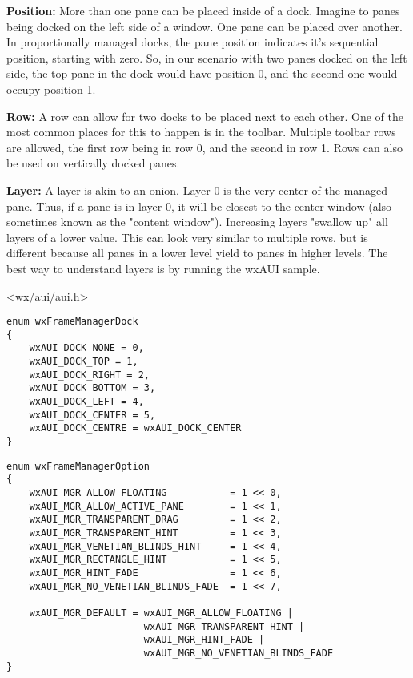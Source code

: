 {\bf Position:}
More than one pane can be placed inside of a dock. Imagine to panes
being docked on the left side of a window. One pane can be placed over
another. In proportionally managed docks, the pane position indicates
it's sequential position, starting with zero. So, in our scenario with
two panes docked on the left side, the top pane in the dock would have
position 0, and the second one would occupy position 1.

{\bf Row:}
A row can allow for two docks to be placed next to each other. One of
the most common places for this to happen is in the toolbar. Multiple
toolbar rows are allowed, the first row being in row 0, and the second
in row 1. Rows can also be used on vertically docked panes.


{\bf Layer:}
A layer is akin to an onion. Layer 0 is the very center of the
managed pane. Thus, if a pane is in layer 0, it will be closest to the
center window (also sometimes known as the "content window").
Increasing layers "swallow up" all layers of a lower value. This can
look very similar to multiple rows, but is different because all panes
in a lower level yield to panes in higher levels. The best way to
understand layers is by running the wxAUI sample.




<wx/aui/aui.h>




\begin{verbatim}
enum wxFrameManagerDock
{
    wxAUI_DOCK_NONE = 0,
    wxAUI_DOCK_TOP = 1,
    wxAUI_DOCK_RIGHT = 2,
    wxAUI_DOCK_BOTTOM = 3,
    wxAUI_DOCK_LEFT = 4,
    wxAUI_DOCK_CENTER = 5,
    wxAUI_DOCK_CENTRE = wxAUI_DOCK_CENTER
}
\end{verbatim}

\begin{verbatim}
enum wxFrameManagerOption
{
    wxAUI_MGR_ALLOW_FLOATING           = 1 << 0,
    wxAUI_MGR_ALLOW_ACTIVE_PANE        = 1 << 1,
    wxAUI_MGR_TRANSPARENT_DRAG         = 1 << 2,
    wxAUI_MGR_TRANSPARENT_HINT         = 1 << 3,
    wxAUI_MGR_VENETIAN_BLINDS_HINT     = 1 << 4,
    wxAUI_MGR_RECTANGLE_HINT           = 1 << 5,
    wxAUI_MGR_HINT_FADE                = 1 << 6,
    wxAUI_MGR_NO_VENETIAN_BLINDS_FADE  = 1 << 7,

    wxAUI_MGR_DEFAULT = wxAUI_MGR_ALLOW_FLOATING |
                        wxAUI_MGR_TRANSPARENT_HINT |
                        wxAUI_MGR_HINT_FADE |
                        wxAUI_MGR_NO_VENETIAN_BLINDS_FADE
}
\end{verbatim}


